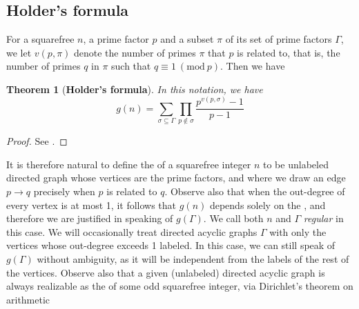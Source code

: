 \documentclass[draft]{article}
\newcommand{\Mod}[1]{\ (\mathrm{mod} \ #1)}
\theoremstyle{plain}
\newtheorem{fact}{Theorem}[section]
\theoremstyle{definition}
\begin{document}
\section{\hgs}
\subsection{Holder's formula}
For a squarefree $n$, a prime factor $p$ and a subset $\pi$ of its set of prime factors $\Gamma$, we let $v(p, \pi)$ denote the number of primes $\pi$ that $p$ is related to, that is, the number of primes $q$ in $\pi$ such that $q \equiv 1 \Mod{p}$. Then we have
\begin{fact}[\textbf{Holder's formula}] In this notation, we have
	\begin{equation*}
		g(n) = \sum_{\sigma \subseteq \Gamma} \prod_{p \notin \sigma} \frac{p^{v(p, \sigma)} - 1}{p - 1}
	\end{equation*}
\end{fact}
\begin{proof} See {\cite{gnumoas}}. \end{proof}

It is therefore natural to define the \emph{\hg} of a squarefree integer $n$ to be unlabeled directed graph whose vertices are the prime factors, and where we draw an edge $p \rightarrow q$ precisely when $p$ is related to $q$. Observe also that when the out-degree of every vertex is at most 1, it follows that $g(n)$ depends solely on the \hg, and therefore we are justified in speaking of $g(\Gamma).$ We call both $n$ and $\Gamma$ \emph{regular} in this case. We will occasionally treat directed acyclic graphs $\Gamma$ with only the vertices whose out-degree exceeds 1 labeled. In this case, we can still speak of $g(\Gamma)$ without ambiguity, as it will be independent from the labels of the rest of the vertices. Observe also that a given (unlabeled) directed acyclic graph is always realizable as the \hg of some odd squarefree integer, via Dirichlet's theorem on arithmetic
\end{document}
